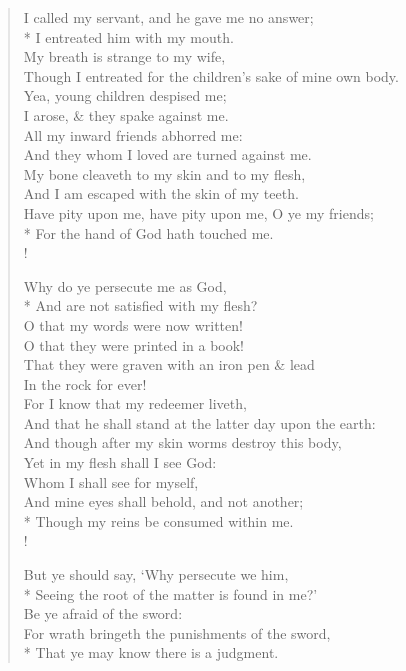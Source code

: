 \documentclass[MAIN]{subfiles}
\begin{document}
\begin{verse}
I called my servant, and he gave me no answer;\\*
\vin I entreated him with my mouth.\\
My breath is strange to my wife,\\
\vin Though I entreated for the children's sake of mine own body.\\
Yea, young children despised me;\\
\vin I arose, \& they spake against me.\\
All my inward friends abhorred me:\\
\vin And they whom I loved are turned against me.\\
My bone cleaveth to my skin and to my flesh,\\
\vin And I am escaped with the skin of my teeth.\\
Have pity upon me, have pity upon me, O ye my friends;\\*
\vin For the hand of God hath touched me.\\!

Why do ye persecute me as God,\\*
\vin And are not satisfied with my flesh?\\
O that my words were now written!\\
\vin O that they were printed in a book!\\
That they were graven with an iron pen \& lead\\
\vin In the rock for ever!\\
For I know that my redeemer liveth,\\
\vin And that he shall stand at the latter day upon the earth:\\
And though after my skin worms destroy this body,\\
\vin Yet in my flesh shall I see God:\\
Whom I shall see for myself,\\
\vin And mine eyes shall behold, and not another;\\*
\vin Though my reins be consumed within me.\\!

But ye should say, `Why persecute we him,\\*
\vin Seeing the root of the matter is found in me?'\\
Be ye afraid of the sword:\\
\vin For wrath bringeth the punishments of the sword,\\*
\vin That ye may know there is a judgment.
\end{verse}
\end{document}
